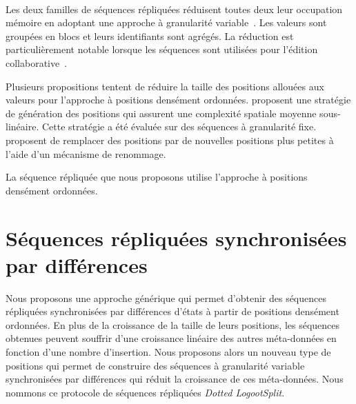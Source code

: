 
\paragraph{}Les deux familles de séquences répliquées réduisent toutes deux leur occupation mémoire en adoptant une approche à granularité variable~\cite{yu_2012_string-wise-crdt, andre_2013_logootsplit, briot_2016_rgasplit}.
Les valeurs sont groupées en blocs et leurs identifiants sont agrégés.
La réduction est particulièrement notable lorsque les séquences sont utilisées pour l'édition collaborative~\autocite{andre_2013_logootsplit,briot_2016_rgasplit}.

Plusieurs propositions tentent de réduire la taille des positions allouées aux valeurs pour l'approche à positions densément ordonnées.
\textcite{nedelec_2013_lseq} proposent une stratégie de génération des positions qui assurent une complexité spatiale moyenne sous-linéaire.
Cette stratégie a été évaluée sur des séquences à granularité fixe.
\textcite{nicolas2020_renaming} proposent de remplacer des positions par de nouvelles positions plus petites à l'aide d'un mécanisme de renommage.


La séquence répliquée que nous proposons utilise l'approche à positions densément ordonnées.


\section{Séquences répliquées synchronisées par différences}\label{sec:delta-seq}


Nous proposons une approche générique qui permet d'obtenir des séquences répliquées synchronisées par différences d'états à partir de positions densément ordonnées.
En plus de la croissance de la taille de leurs positions, les séquences obtenues peuvent souffrir d'une croissance linéaire des autres méta-données en fonction d'une nombre d'insertion.
Nous proposons alors un nouveau type de positions qui permet de construire des séquences à granularité variable synchronisées par différences qui réduit la croissance de ces méta-données.
Nous nommons ce protocole de séquences répliquées \emph{Dotted LogootSplit}.

